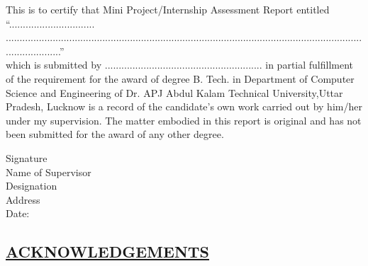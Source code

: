 \doublespacing
This is to certify that Mini Project/Internship Assessment Report entitled “...............................\\.....................................................................................................................................................”\\which
is submitted by ......................................................... in partial fulfillment of the requirement for the award of degree B. Tech. in Department of Computer Science and Engineering of Dr. APJ Abdul Kalam Technical University,Uttar Pradesh, Lucknow is a record of the candidate’s own work carried out by him/her under my supervision. The matter embodied in this report is original and has not been submitted for the award of any other degree.
\vspace{15 mm}
\\
\begin{flushleft}

Signature\\
\vspace{10 mm}
Name of Supervisor\\
Designation\\
Address\\
\vspace{10mm}
Date:
\end{flushleft}
\restoregeometry
\newpage

\begin{center}
 \chapter*{\size \underline{ACKNOWLEDGEMENTS}}   
\end{center}
\restoregeometry
\\
